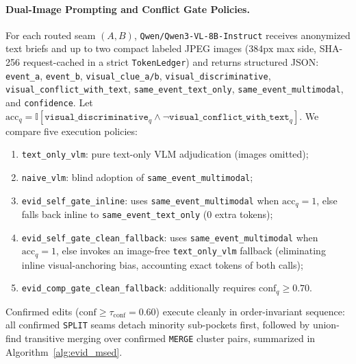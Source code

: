 \paragraph{Dual-Image Prompting and Conflict Gate Policies.}
For each routed seam $(A, B)$, \texttt{Qwen/Qwen3-VL-8B-Instruct} receives anonymized text briefs and up to two compact labeled JPEG images ($384\text{px}$ max side, SHA-256 request-cached in a strict \texttt{TokenLedger}) and returns structured JSON: \texttt{event\_a}, \texttt{event\_b}, \texttt{visual\_clue\_a/b}, \texttt{visual\_discriminative}, \texttt{visual\_conflict\_with\_text}, \texttt{same\_event\_text\_only}, \texttt{same\_event\_multimodal}, and \texttt{confidence}. Let $\text{acc}_q = \mathbb{I}[\texttt{visual\_discriminative}_q \wedge \neg\texttt{visual\_conflict\_with\_text}_q]$. We compare five execution policies:
\begin{enumerate}
    \item \texttt{text\_only\_vlm}: pure text-only VLM adjudication (images omitted);
    \item \texttt{naive\_vlm}: blind adoption of \texttt{same\_event\_multimodal};
    \item \texttt{evid\_self\_gate\_inline}: uses \texttt{same\_event\_multimodal} when $\text{acc}_q=1$, else falls back inline to \texttt{same\_event\_text\_only} ($0$ extra tokens);
    \item \texttt{evid\_self\_gate\_clean\_fallback}: uses \texttt{same\_event\_multimodal} when $\text{acc}_q=1$, else invokes an image-free \texttt{text\_only\_vlm} fallback (eliminating inline visual-anchoring bias, accounting exact tokens of both calls);
    \item \texttt{evid\_comp\_gate\_clean\_fallback}: additionally requires $\text{conf}_q \ge 0.70$.
\end{enumerate}
Confirmed edits ($\text{conf} \ge \tau_{\text{conf}} = 0.60$) execute cleanly in order-invariant sequence: all confirmed \texttt{SPLIT} seams detach minority sub-pockets first, followed by union-find transitive merging over confirmed \texttt{MERGE} cluster pairs, summarized in Algorithm~\ref{alg:evid_msed}.

